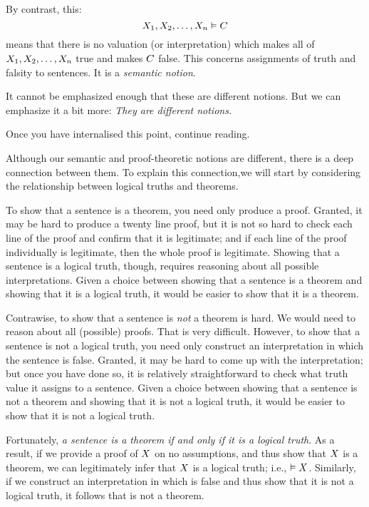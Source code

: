 By contrast, this:
$$X_1, X_2, \ldots, X_n \vDash C$$
means that there is no valuation (or interpretation) which makes all of $X_1, X_2, \ldots, X_n$ true and makes $C$ false. This concerns assignments of truth and falsity to sentences. It is a \emph{semantic notion}.

It cannot be emphasized enough that these are different notions. But we can emphasize it a bit more: \emph{They are different notions.}

Once you have internalised this point, continue reading.

Although our semantic and proof-theoretic notions are different, there is a deep connection between them. To explain this connection,we will start by considering the relationship between logical truths and theorems.

To show that a sentence is a theorem, you need only produce a proof. Granted, it may be hard to produce a twenty line proof, but it is not so hard to check each line of the proof and confirm that it is legitimate; and if each line of the proof individually is legitimate, then the whole proof is legitimate. Showing that a sentence is a logical truth, though, requires reasoning about all possible interpretations. Given a choice between showing that a sentence is a theorem and showing that it is a logical truth, it would be easier to show that it is a theorem.

Contrawise, to show that a sentence is \emph{not} a theorem is hard. We would need to reason about all (possible) proofs. That is very difficult. However, to show that a sentence is not a logical truth, you need only construct an interpretation in which the sentence is false. Granted, it may be hard to come up with the interpretation; but once you have done so, it is relatively straightforward to check what truth value it assigns to a sentence. Given a choice between showing that a sentence is not a theorem and showing that it is not a logical truth, it would be easier to show that it is not a logical truth.

Fortunately, \emph{a sentence is a theorem if and only if it is a logical truth}. As a result, if we provide a proof of $X$ on no assumptions, and thus show that $X$ is a theorem, we can legitimately infer that $X$ is a logical truth; i.e., $\vDash X$. Similarly, if we construct an interpretation in which \metaX is false and thus show that it is not a logical truth, it follows that \metaX is not a theorem.


